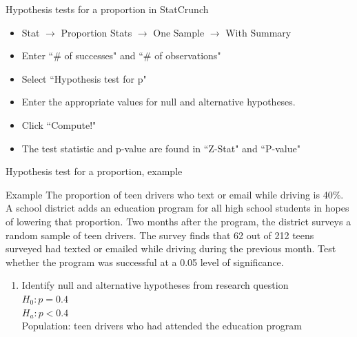 \documentclass[xcolor=table]{beamer}
\begin{document}
\begin{frame}{Hypothesis tests for a proportion in StatCrunch}

\begin{block}{}
\large
\begin{itemize}
\item Stat $\to$ Proportion Stats $\to$ One Sample $\to$ With Summary
\item Enter ``\# of successes" and ``\# of observations"
\item Select ``Hypothesis test for p"
\item Enter the appropriate values for null and alternative hypotheses.
\item Click ``Compute!"
\item The test statistic and p-value are found in ``Z-Stat" and ``P-value"
\end{itemize}
\end{block}

\end{frame}

\begin{frame}{Hypothesis test for a proportion, example}
\begin{exampleblock}{Example}
\large
The proportion of teen drivers who text or email while driving is 40\%. A school district adds an education program for all high school students in hopes of lowering that proportion. Two months after the program, the district surveys a random sample of teen drivers. The survey finds that 62 out of 212 teens surveyed had texted or emailed while driving during the previous month. Test whether the program was successful at a 0.05 level of significance.
\begin{enumerate}
\pause\item Identify null and alternative hypotheses from research question\\
\pause$H_0: p = 0.4$\\
$H_a: p < 0.4$\\
Population: teen drivers who had attended the education program
\end{enumerate}
\end{exampleblock}
\end{frame}
\end{document}
